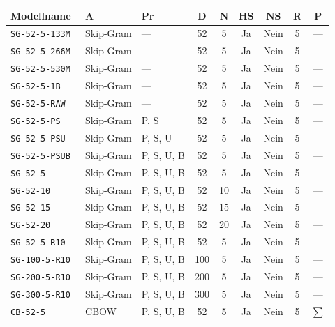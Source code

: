 \begin{table}[!ht]\vspace{1ex}\small\centering{}\begin{tabular}{|l|l|l|c|c|c|c|c|c|}
\hline Modellname & A         & Pr         & D   & N  & HS   & NS   & R  & P \\ \hline\hline
\tt{SG-52-5-133M} & Skip-Gram & ---        & 52  & 5  & Ja   & Nein & 5  & ---    \\ \hline
\tt{SG-52-5-266M} & Skip-Gram & ---        & 52  & 5  & Ja   & Nein & 5  & ---    \\ \hline
\tt{SG-52-5-530M} & Skip-Gram & ---        & 52  & 5  & Ja   & Nein & 5  & ---    \\ \hline
\tt{SG-52-5-1B}   & Skip-Gram & ---        & 52  & 5  & Ja   & Nein & 5  & ---    \\ \hline\hline
\tt{SG-52-5-RAW}  & Skip-Gram & ---        & 52  & 5  & Ja   & Nein & 5  & ---    \\ \hline
\tt{SG-52-5-PS}   & Skip-Gram & P, S       & 52  & 5  & Ja   & Nein & 5  & ---    \\ \hline
\tt{SG-52-5-PSU}  & Skip-Gram & P, S, U    & 52  & 5  & Ja   & Nein & 5  & ---    \\ \hline
\tt{SG-52-5-PSUB} & Skip-Gram & P, S, U, B & 52  & 5  & Ja   & Nein & 5  & ---    \\ \hline\hline
\tt{SG-52-5}      & Skip-Gram & P, S, U, B & 52  & 5  & Ja   & Nein & 5  & ---    \\ \hline
\tt{SG-52-10}     & Skip-Gram & P, S, U, B & 52  & 10 & Ja   & Nein & 5  & ---    \\ \hline
\tt{SG-52-15}     & Skip-Gram & P, S, U, B & 52  & 15 & Ja   & Nein & 5  & ---    \\ \hline
\tt{SG-52-20}     & Skip-Gram & P, S, U, B & 52  & 20 & Ja   & Nein & 5  & ---    \\ \hline\hline
\tt{SG-52-5-R10}  & Skip-Gram & P, S, U, B & 52  & 5  & Ja   & Nein & 5  & ---    \\ \hline
\tt{SG-100-5-R10} & Skip-Gram & P, S, U, B & 100 & 5  & Ja   & Nein & 5  & ---    \\ \hline
\tt{SG-200-5-R10} & Skip-Gram & P, S, U, B & 200 & 5  & Ja   & Nein & 5  & ---    \\ \hline
\tt{SG-300-5-R10} & Skip-Gram & P, S, U, B & 300 & 5  & Ja   & Nein & 5  & ---    \\ \hline\hline
\tt{CB-52-5}      & CBOW      & P, S, U, B & 52  & 5  & Ja   & Nein & 5  & $\sum$ \\ \hline

\end{tabular}
\end{table}
